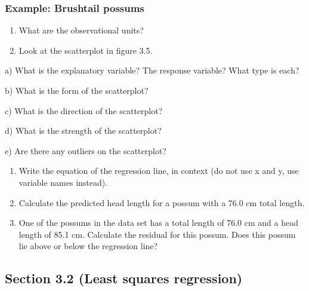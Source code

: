 \documentclass[
]{report}
\newcommand{\rgs}{\vspace{12pt}} %
\newcommand{\rgi}{\hspace{24pt}}  %
\begin{document}
\hypertarget{example-brushtail-possums}{%
\subsubsection*{Example: Brushtail possums}\label{example-brushtail-possums}}

\begin{enumerate}
\def\labelenumi{\arabic{enumi}.}
\item
  What are the observational units?\\
  \rgs
\item
  Look at the scatterplot in figure 3.5.
\end{enumerate}

\rgi a) What is the explanatory variable? The response variable? What type is each?
\rgs

\rgi b) What is the form of the scatterplot?\\
\rgs

\rgi c) What is the direction of the scatterplot?
\rgs

\rgi d) What is the strength of the scatterplot?
\rgs

\rgi e) Are there any outliers on the scatterplot?\\
\rgs

\begin{enumerate}
\def\labelenumi{\arabic{enumi}.}
\setcounter{enumi}{2}
\item
  Write the equation of the regression line, in context (do not use x and y, use variable names instead).
  \rgs
\item
  Calculate the predicted head length for a possum with a 76.0 cm total length.
  \rgs
\item
  One of the possums in the data set has a total length of 76.0 cm and a head length of 85.1 cm. Calculate the residual for this possum. Does this possum lie above or below the regression line?
  \rgs
\end{enumerate}

\hypertarget{section-3.2-least-squares-regression}{%
\subsection*{Section 3.2 (Least squares regression)}\label{section-3.2-least-squares-regression}}

\end{document}
